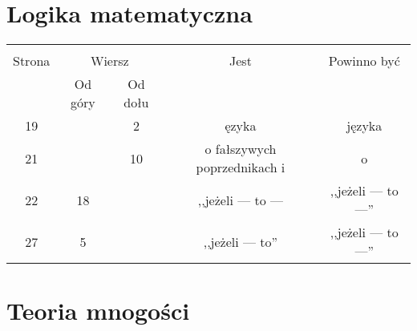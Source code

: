 \documentclass[a4paper,11pt]{article}
\begin{document}
\vspace{\spaceTwo}





\newpage
\section{Logika matematyczna}

\vspace{\spaceTwo}





\begin{center}
  \begin{tabular}{|c|c|c|c|c|}
    \hline
    & \multicolumn{2}{c|}{} & & \\
    Strona & \multicolumn{2}{c|}{Wiersz} & Jest
                              & Powinno być \\ \cline{2-3}
    & Od góry & Od dołu & & \\
    \hline
    19  & &  2 & ęzyka & języka \\
    21  & & 10 & o fałszywych poprzednikach i & o \\
    22  & 18 & & ,,jeżeli --- to ---  %
           & ,,jeżeli --- to ---'' \\
    27  &  5 & & ,,jeżeli --- to'' & ,,jeżeli --- to ---'' \\
    \hline
  \end{tabular}
\end{center}

\vspace{\spaceTwo}





\newpage
\section{Teoria mnogości}

\vspace{\spaceTwo}
\end{document}
